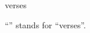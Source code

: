 \documentclass{stex}
\begin{document}
\begin{smodule}{verses}
\begin{sparagraph}[style=symdoc]
``'' stands for ``verses''.
\end{sparagraph}
\end{smodule}
\end{document}
